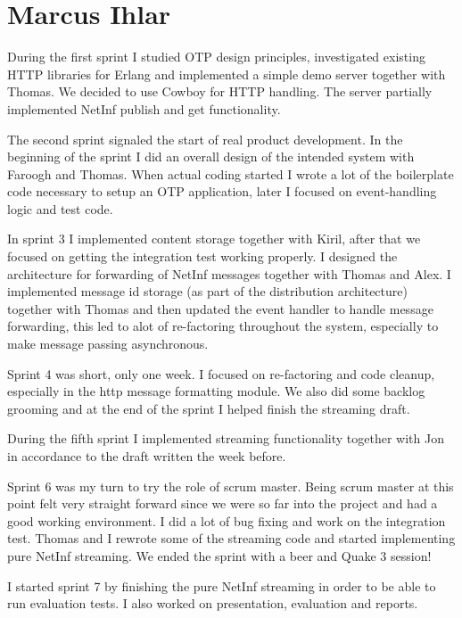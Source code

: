 \section{Marcus Ihlar}
During the first sprint I studied OTP design principles, investigated existing HTTP libraries for Erlang and implemented a simple demo server together with Thomas. We decided to use Cowboy for HTTP handling. The server partially implemented NetInf publish and get functionality.

The second sprint signaled the start of real product development. In the beginning of the sprint I did an overall design of the intended system with Faroogh and Thomas. When actual coding started I wrote a lot of the boilerplate code necessary to setup an OTP application, later I focused on event-handling logic and test code.

In sprint 3 I implemented content storage together with Kiril, after that we focused on getting the integration test working properly. I designed the architecture for forwarding of NetInf messages together with Thomas and Alex. I implemented message id storage (as part of the distribution architecture) together with Thomas and then updated the event handler to handle message forwarding, this led to alot of re-factoring throughout the system, especially to make message passing asynchronous. 

Sprint 4 was short, only one week. I focused on re-factoring and code cleanup, especially in the http message formatting module. We also did some backlog grooming and at the end of the sprint I helped finish the streaming draft.

During the fifth sprint I implemented streaming functionality together with Jon in accordance to the draft written the week before. 

Sprint 6 was my turn to try the role of scrum master. Being scrum master at this point felt very straight forward since we were so far into the project and had a good working environment. I did a lot of bug fixing and work on the integration test. Thomas and I rewrote some of the streaming code and started implementing pure NetInf streaming. We ended the sprint with a beer and Quake 3 session!

I started sprint 7 by finishing the pure NetInf streaming in order to be able to run evaluation tests. I also worked on presentation, evaluation and reports.
 

 



